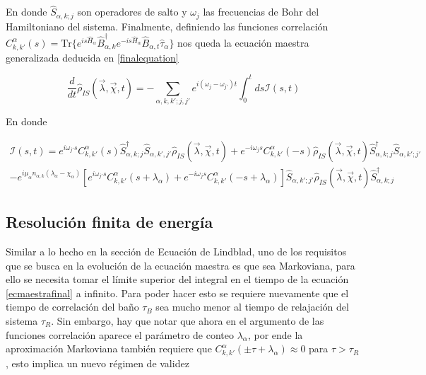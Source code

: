 En donde $\hat{S}_{\alpha,k;j}$ son operadores de salto y $\omega_{j}$ las frecuencias de Bohr del Hamiltoniano del sistema. Finalmente, definiendo las funciones correlación $C^{\alpha}_{k,k'}(s) = \text{Tr}\{e^{is\hat{H}_{\alpha} }\hat{B}^{\dagger}_{\alpha,k}e^{-is\hat{H}_{\alpha} }\hat{B}_{\alpha,t}\hat{\tau}_{\alpha}\}$ nos queda la ecuación maestra generalizada deducida en \ref{finalequation}

\begin{equation}
    \frac{d}{dt}\hat{\rho}_{IS}(\vec{\lambda},\vec{\chi},t) = - \sum_{\alpha,k,k';j,j'}e^{i(\omega_{j}-\omega_{j'})t}\int_{0}^{t}ds \mathcal{I}(s,t) 
\label{ecmaestrafinal}
\end{equation}

En donde

\begin{multline*}
    \mathcal{I}(s,t) = e^{i\omega_{j'}s} C^{\alpha}_{k,k'}(s)\hat{S}^{\dagger}_{\alpha,k;j}\hat{S}_{\alpha,k',j'}\hat{\rho}_{IS}(\vec{\lambda},\vec{\chi},t) + e^{-i\omega_{j}s}C^{\alpha}_{k,k'}(-s)\hat{\rho}_{IS}(\vec{\lambda},\vec{\chi},t)\hat{S}^{\dagger}_{\alpha,k;j}\hat{S}_{\alpha,k';j'} \\
    - e^{i\mu_{\alpha}n_{\alpha,k}(\lambda_{\alpha} - \chi_{\alpha})}\left[e^{i\omega_{j'}s}C^{\alpha}_{k,k'}(s+\lambda_{\alpha}) + e^{-i\omega_{j}s}C^{\alpha}_{k,k'}(-s+\lambda_{\alpha})  \right]  \hat{S}_{\alpha,k';j'}\hat{\rho}_{IS}(\vec{\lambda},\vec{\chi},t)\hat{S}^{\dagger}_{\alpha,k;j}
\end{multline*}

\label{sec2:master}

\subsection{Resolución finita de energía}
Similar a lo hecho en la sección de Ecuación de Lindblad, uno de los requisitos que se busca en la evolución de la ecuación maestra es que sea Markoviana, para ello se necesita tomar el límite superior del integral en el tiempo de la ecuación \ref{ecmaestrafinal} a infinito. Para poder hacer esto se requiere nuevamente que el tiempo de correlación del baño $\tau_{B}$ sea mucho menor al tiempo de relajación del sistema $\tau_{R}$. Sin embargo, hay que notar que ahora en el argumento de las funciones correlación aparece el parámetro de conteo $\lambda_{\alpha}$, por ende la aproximación Markoviana también requiere que $C^{\alpha}_{k,k'}(\pm \tau + \lambda_\alpha) \approx 0$ para $\tau > \tau_{R}$, esto implica un nuevo régimen de validez

